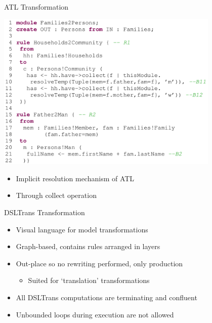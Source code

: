 \documentclass[xcolor=dvipsnames, 12pt]{beamer}
\begin{document}
\begin{frame}{ATL Transformation}
\begin{center}
\includegraphics[width=0.8\textwidth]{figures/ATL_code}
\end{center}
\pause
\begin{itemize}
\item Implicit resolution mechanism of ATL
\item Through collect operation
\end{itemize}
\end{frame}

\begin{frame}{DSLTrans Transformation}

\begin{itemize}[<+->]
\item Visual language for model transformations
\item Graph-based, contains rules arranged in layers

\end{itemize}
\pause
\begin{itemize}[<+->]
\item Out-place so no rewriting performed, only production
\begin{itemize}
\item Suited for `translation' transformations
\end{itemize}
\item All DSLTrans computations are terminating and confluent
\item Unbounded loops during execution are not allowed
\end{itemize}
\end{frame}
\end{document}
